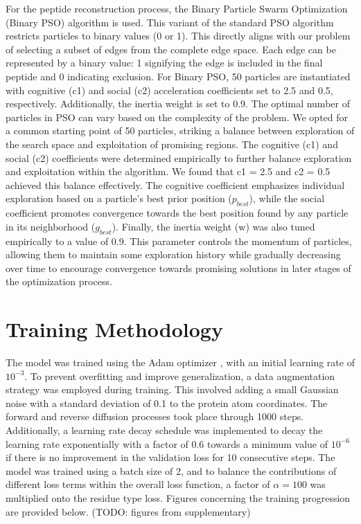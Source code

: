 For the peptide reconstruction process, the Binary Particle Swarm Optimization (Binary PSO) algorithm is used. This variant of the standard PSO algorithm restricts particles to binary values (0 or 1). This directly aligns with our problem of selecting a subset of edges from the complete edge space. Each edge can be represented by a binary value: 1 signifying the edge is included in the final peptide and 0 indicating exclusion. For Binary PSO, 50 particles are instantiated with cognitive (c1) and social (c2) acceleration coefficients set to 2.5 and 0.5, respectively. Additionally, the inertia weight is set to 0.9.
The optimal number of particles in PSO can vary based on the complexity of the problem. We opted for a common starting point of 50 particles, striking a balance between exploration of the search space and exploitation of promising regions. The cognitive (c1) and social (c2) coefficients were determined empirically to further balance exploration and exploitation within the algorithm. We found that c1 = 2.5 and c2 = 0.5 achieved this balance effectively. The cognitive coefficient emphasizes individual exploration based on a particle's best prior position ($p_{best}$), while the social coefficient promotes convergence towards the best position found by any particle in its neighborhood ($g_{best}$). Finally, the inertia weight (w) was also tuned empirically to a value of 0.9. This parameter controls the momentum of particles, allowing them to maintain some exploration history while gradually decreasing over time to encourage convergence towards promising solutions in later stages of the optimization process.

\section{Training Methodology}
The model was trained using the Adam optimizer \cite{kingma2014adam}, with an initial learning rate of $10^{-3}$. To prevent overfitting and improve generalization, a data augmentation strategy was employed during training. This involved adding a small Gaussian noise with a standard deviation of 0.1 to the protein atom coordinates. The forward and reverse diffusion processes took place through 1000 steps. Additionally, a learning rate decay schedule was implemented to decay the learning rate exponentially with a factor of 0.6 towards a minimum value of $10^{-6}$ if there is no improvement in the validation loss for 10 consecutive steps. The model was trained using a batch size of 2, and to balance the contributions of different loss terms within the overall loss function, a factor of $\alpha = 100$ was multiplied onto the residue type loss. Figures concerning the training progression are provided below. (TODO: figures from supplementary) \\

